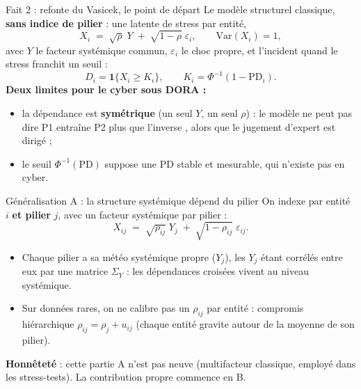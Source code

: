 \documentclass[11pt]{beamer}
\begin{document}
\begin{frame}{Fait 2 : refonte du Vasicek, le point de départ}
Le modèle structurel classique, \textbf{sans indice de pilier} : une latente de stress
par entité,
\[
X_i \;=\; \sqrt{\rho}\;Y \;+\; \sqrt{1-\rho}\;\varepsilon_i,
\qquad \mathrm{Var}(X_i) = 1,
\]
avec $Y$ le facteur systémique commun, $\varepsilon_i$ le choc propre, et l'incident
quand le stress franchit un seuil :
\[
D_i = \mathbf{1}\{X_i \ge K_i\}, \qquad K_i = \Phi^{-1}(1-\mathrm{PD}_i).
\]
\medskip
\textbf{Deux limites pour le cyber sous DORA :}
\begin{itemize}
\item la dépendance est \textbf{symétrique} (un seul $Y$, un seul $\rho$) : le modèle ne
      peut pas dire \og P1 entraîne P2 plus que l'inverse \fg, alors que le jugement
      d'expert est dirigé ;
\item le seuil $\Phi^{-1}(\mathrm{PD})$ suppose une PD stable et mesurable, qui n'existe
      pas en cyber.
\end{itemize}
\end{frame}

\begin{frame}{Généralisation A : la structure systémique dépend du pilier}
On indexe par entité $i$ \textbf{et pilier} $j$, avec un facteur systémique par pilier :
\[
X_{ij} \;=\; \sqrt{\rho_{ij}}\;Y_j \;+\; \sqrt{1-\rho_{ij}}\;\varepsilon_{ij}.
\]
\begin{itemize}
\item Chaque pilier a sa \og météo systémique \fg{} propre ($Y_j$), les $Y_j$ étant
      corrélés entre eux par une matrice $\Sigma_Y$ : les dépendances croisées vivent
      au niveau systémique.
\item Sur données rares, on ne calibre pas un $\rho_{ij}$ par entité : compromis
      hiérarchique $\rho_{ij} = \rho_j + u_{ij}$ (chaque entité gravite autour de la
      moyenne de son pilier).
\end{itemize}
\medskip
\textbf{Honnêteté} : cette partie A n'est pas neuve (multifacteur classique, employé dans
les stress-tests). La contribution propre commence en B.
\end{frame}
\end{document}
